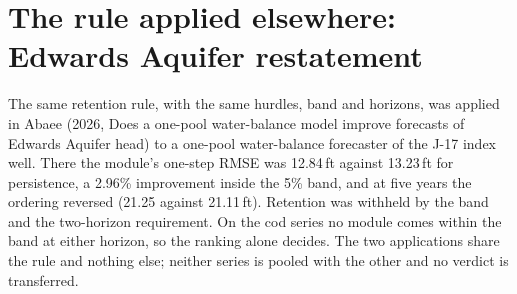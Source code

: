 \FloatBarrier
\section{The rule applied elsewhere: Edwards Aquifer restatement}\label{si:edwards}

The same retention rule, with the same hurdles, band and horizons, was applied in Abaee (2026, Does a one-pool water-balance model improve forecasts of Edwards Aquifer head) to a one-pool water-balance forecaster of the J-17 index well. There the module's one-step RMSE was 12.84\,ft against 13.23\,ft for persistence, a 2.96\% improvement inside the 5\% band, and at five years the ordering reversed (21.25 against 21.11\,ft). Retention was withheld by the band and the two-horizon requirement. On the cod series no module comes within the band at either horizon, so the ranking alone decides. The two applications share the rule and nothing else; neither series is pooled with the other and no verdict is transferred.
